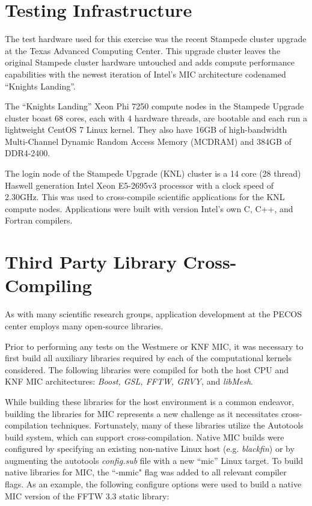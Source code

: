 \section{Testing Infrastructure}
\label{sec:hardware}

The test hardware used for this exercise was the recent Stampede cluster
upgrade at the Texas Advanced Computing Center.  This upgrade cluster leaves
the original Stampede cluster hardware untouched and adds compute performance
capabilities with the newest iteration of Intel's MIC architecture codenamed
``Knights Landing''.

The ``Knights Landing'' Xeon Phi 7250 compute nodes in the Stampede Upgrade
cluster boast 68 cores, each with 4 hardware threads, are bootable and each run
a lightweight CentOS 7 Linux kernel.  They also have 16GB of high-bandwidth
Multi-Channel Dynamic Random Access Memory (MCDRAM) and 384GB of DDR4-2400.

The login node of the Stampede Upgrade (KNL) cluster is a 14 core (28 thread)
Haswell generation Intel Xeon E5-2695v3 processor with a clock speed of
2.30GHz.  This was used to cross-compile scientific applications for the KNL
compute nodes.  Applications were built with version  Intel's own C, C++, and
Fortran compilers.

\section{Third Party Library Cross-Compiling} \label{sec:cross_compile}

As with many scientific research groups, application development at
the PECOS center employs many open-source libraries.

Prior to
performing any tests on the Westmere or KNF MIC, it was necessary to
first build all auxiliary libraries required by each of the
computational kernels considered.
The following libraries were
compiled for both the host CPU and KNF MIC architectures: {\em Boost,
GSL, FFTW\cite{FFTW05}, GRVY,} and
{\em libMesh}.

While building these libraries for the host environment is
a common endeavor, building the libraries for MIC
represents a new challenge as it necessitates cross-compilation
techniques.
Fortunately, many of these libraries utilize the
Autotools build system, which can support cross-compilation.
Native MIC builds were configured by
specifying an existing non-native Linux host
(e.g. {\em blackfin}) or by augmenting the autotools {\em config.sub}
file with a new ``mic'' Linux target.
To build native libraries for MIC, the ``-mmic"
flag was added to all relevant compiler flags.
As an example, the following configure options were used to build a
native MIC version of the FFTW 3.3 static library:

